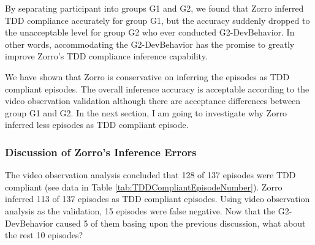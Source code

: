 By separating participant into groups G1 and G2, we found that 
Zorro inferred TDD compliance accurately for group G1, but the 
accuracy suddenly dropped to the unacceptable level for
group G2 who ever conducted G2-DevBehavior. In other words, 
accommodating the G2-DevBehavior has the promise to greatly improve 
Zorro's TDD compliance inference capability. 

We have shown that Zorro is conservative on inferring the episodes 
as TDD compliant episodes. The overall inference accuracy is 
acceptable according to the video observation validation 
although there are acceptance differences between group G1 and 
G2. In the next section, I am going to investigate why Zorro
inferred less episodes as TDD compliant episode. 

\subsubsection{Discussion of Zorro's Inference Errors}
The video observation analysis concluded that 128 of 137 episodes 
were TDD compliant (see data in Table \ref{tab:TDDCompliantEpisodeNumber}). 
Zorro inferred 113 of 137 episodes as TDD compliant episodes.
Using video observation analysis as the validation, 15 episodes
were false negative. Now that the G2-DevBehavior caused 5 of them
basing upon the previous discussion, what about the rest 10 
episodes?  

